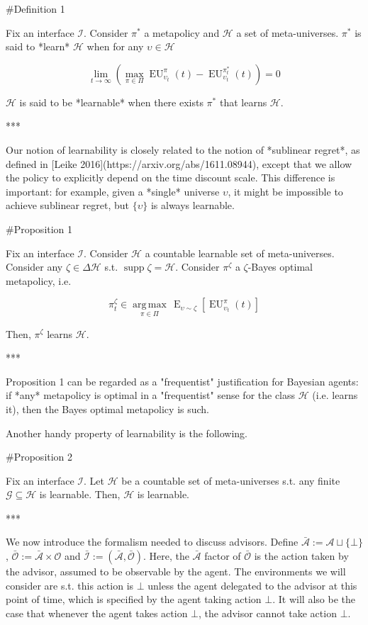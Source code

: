 \documentclass[a4paper]{article}
\DeclareMathOperator{\Supp}{supp}
\newcommand{\E}{\operatorname{E}}
\newcommand{\Argmax}[1]{\underset{#1}{\operatorname{arg\,max}}\,}
\newcommand{\Ob}{\mathcal{O}}
\newcommand{\A}{\mathcal{A}}
\newcommand{\I}{\mathcal{I}}
\newcommand{\Ado}{\bar{\Ob}}
\newcommand{\Ada}{\bar{\A}}
\newcommand{\Adi}{\bar{\I}}
\newcommand{\Hy}{\mathcal{H}}
\newcommand{\EU}{\operatorname{EU}}
\begin{document}
\#Definition 1

Fix an interface $\I$. Consider $\pi^*$ a metapolicy and $\Hy$ a set of meta-universes. $\pi^*$ is said to *learn* $\Hy$ when for any $\upsilon \in \Hy$

$$\lim_{t \rightarrow \infty} (\max_{\pi \in \Pi} \EU_{\upsilon_t}^{\pi}(t) - \EU_{\upsilon_t}^{\pi^*_t}(t)) = 0$$

$\Hy$ is said to be *learnable* when there exists $\pi^*$ that learns $\Hy$.

***

Our notion of learnability is closely related to the notion of *sublinear regret*, as defined in [Leike 2016](https://arxiv.org/abs/1611.08944), except that we allow the policy to explicitly depend on the time discount scale. This difference is important: for example, given a *single* universe $\upsilon$, it might be impossible to achieve sublinear regret, but $\{\upsilon\}$ is always learnable.

\#Proposition 1

Fix an interface $\I$. Consider $\Hy$ a countable learnable set of meta-universes. Consider any $\zeta \in \Delta\Hy$ s.t. $\Supp \zeta = \Hy$. Consider $\pi^\zeta$ a $\zeta$-Bayes optimal metapolicy, i.e.

$$\pi^\zeta_t \in \Argmax{\pi \in \Pi} \E_{\upsilon \sim \zeta}[\EU_{\upsilon_t}^{\pi}(t)]$$

Then, $\pi^\zeta$ learns $\Hy$.

***

Proposition 1 can be regarded as a "frequentist" justification for Bayesian agents: if *any* metapolicy is optimal in a "frequentist" sense for the class $\Hy$ (i.e. learns it), then the Bayes optimal metapolicy is such.

Another handy property of learnability is the following.

\#Proposition 2

Fix an interface $\I$. Let $\Hy$ be a countable set of meta-universes s.t. any finite $\mathcal{G} \subseteq \Hy$ is learnable. Then, $\Hy$ is learnable.

***

We now introduce the formalism needed to discuss advisors. Define $\Ada:=\A \sqcup \{\bot\}$, $\Ado:=\Ada \times \Ob$ and $\Adi:=(\Ada,\Ado)$. Here, the $\Ada$ factor of $\Ado$ is the action taken by the advisor, assumed to be observable by the agent. The environments we will consider are s.t. this action is $\bot$ unless the agent delegated to the advisor at this point of time, which is specified by the agent taking action $\bot$. It will also be the case that whenever the agent takes action $\bot$, the advisor cannot take action $\bot$.
\end{document}
